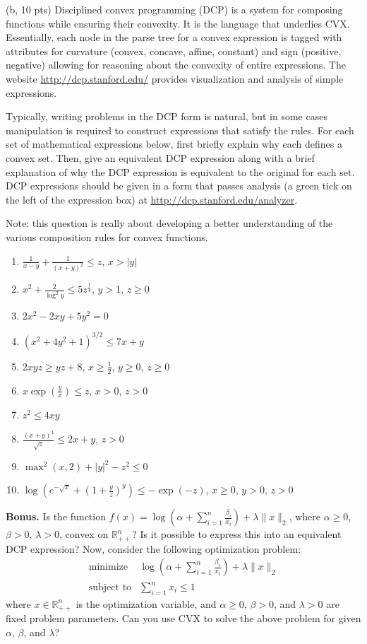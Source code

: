 \documentclass{article}
\theoremstyle{remark}
\theoremstyle{definition}
\def\R{\mathbb{R}}
\begin{document}
\bigskip
\noindent
(b, 10 pts) Disciplined convex programming (DCP) is a system for composing
functions while ensuring their convexity. It is the language that
underlies CVX.
Essentially, each node in the parse tree for a convex
expression is tagged with attributes for curvature (convex, concave, affine,
constant) and sign (positive, negative) allowing for reasoning about the
convexity of entire expressions. The website \url{http://dcp.stanford.edu/}
provides visualization and analysis of simple expressions.

Typically, writing problems in the DCP form is natural, but in some cases
manipulation is required to construct expressions that satisfy the
rules. For each set of mathematical expressions below, first briefly explain why each defines a convex set. Then, give an equivalent DCP expression along with a brief explanation of why the DCP expression is equivalent to the original for each set. DCP expressions should be given in a form that passes analysis (a green tick on the left of the expression box) at \url{http://dcp.stanford.edu/analyzer}.

Note: this question is really about developing a better understanding of
the various composition rules for convex functions.

\begin{enumerate}
	\item $\frac{1}{x-y} + \frac{1}{(x+y)^2} \le z$, $x>|y|$
	\item $x^2 + \frac{2}{\log^2y} \le 5z^{\frac{1}{4}}$, $y > 1$, $z \ge 0$
	\item $2x^2 - 2xy + 5y^2 = 0$
	\item $(x^2 + 4y^2 + 1)^{3/2} \le 7x + y$
	\item $2xyz \ge yz + 8$, $x \ge \frac{1}{2}$, $y \ge 0$, $z \ge 0$
	\item $x\exp\left({\frac{y}{x}}\right) \le z$, $x > 0$, $z > 0$
	\item $z^2 \le 4xy$ 
	\item $\frac{(x+y)^4}{\sqrt{z}} \le 2x + y$, $z > 0$
	\item $\max^2(x,2) + |y|^2 - z^2\le 0$
	\item $\log \left( e^{-\sqrt{x}} + \left(1 + \frac{y}{z}\right)^y \right) \le -\exp(-z)$, $x \ge 0$, $y > 0$, $z > 0$
\end{enumerate}

{\bf Bonus.} Is the function $f(x) = \log \left( \alpha + \sum_{i=1}^{n} \frac{\beta_i}{x_i} \right) + \lambda \|x\|_2$, where $\alpha \ge 0$, $\beta >0$, $\lambda > 0$, convex on $\R^n_{++}$? Is it possible to express this into an equivalent DCP expression? Now, consider the following optimization problem:
	\begin{equation*}
	\begin{array}{ll}
	\mbox{minimize}   &  \log \left( \alpha + \sum_{i=1}^{n} \frac{\beta_i}{x_i} \right) + \lambda \|x\|_2 \\
	\mbox{subject to} &  \sum_{i=1}^{n} x_i \le 1
	\end{array}
	\end{equation*}
	where $x \in \R^n_{++}$ is the optimization variable, and $\alpha \ge 0$, $\beta > 0$, and $\lambda > 0$ are fixed problem parameters. Can you use CVX to solve the above problem for given $\alpha$, $\beta$, and $\lambda$?
\end{document}
